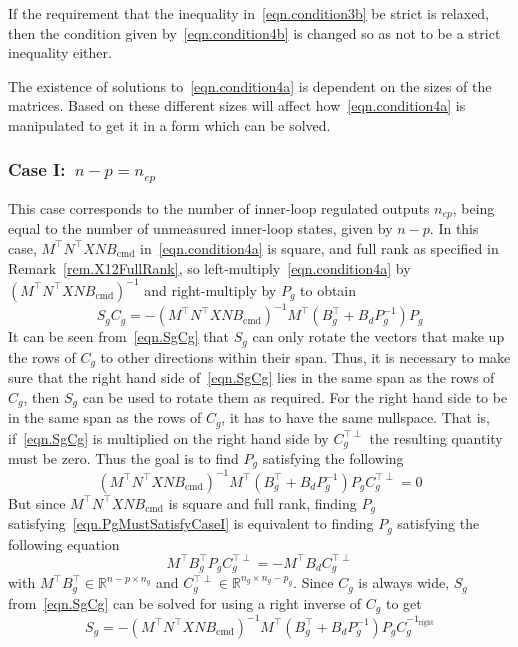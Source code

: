 \begin{rem-dan}
  If the requirement that the inequality in\ \eqref{eqn.condition3b} be strict is relaxed, then the condition given by\ \eqref{eqn.condition4b} is changed so as not to be a strict inequality either.
\end{rem-dan}

The existence of solutions to\ \eqref{eqn.condition4a} is dependent on the sizes of the matrices.
Based on these different sizes will affect how\ \eqref{eqn.condition4a} is manipulated to get it in a form which can be solved.

\subsubsection{Case I:~$n-p=n_{ep}$}

This case corresponds to the number of inner-loop regulated outputs $n_{ep}$, being equal to the number of unmeasured inner-loop states, given by $n-p$.
In this case, $M^{\top}N^{\top}XNB_{\text{cmd}}$ in\ \eqref{eqn.condition4a} is square, and full rank as specified in Remark~\ref{rem.X12FullRank}, so left-multiply\ \eqref{eqn.condition4a} by $(M^{\top}N^{\top}XNB_{\text{cmd}})^{-1}$ and right-multiply by $P_{g}$ to obtain
\begin{equation}
  \label{eqn.SgCg}
  S_{g}C_{g} = - (M^{\top}N^{\top}XNB_{\text{cmd}})^{-1}M^{\top}(B_{g}^{\top}+B_{d}P_{g}^{-1})P_{g}
\end{equation}
It can be seen from\ \eqref{eqn.SgCg} that $S_{g}$ can only rotate the vectors that make up the rows of $C_{g}$ to other directions within their span.
Thus, it is necessary to make sure that the right hand side of\ \eqref{eqn.SgCg} lies in the same span as the rows of $C_{g}$, then $S_{g}$ can be used to rotate them as required.
For the right hand side to be in the same span as the rows of $C_{g}$, it has to have the same nullspace.
That is, if\ \eqref{eqn.SgCg} is multiplied on the right hand side by $C_{g}^{\top\perp}$ the resulting quantity must be zero.
Thus the goal is to find $P_{g}$ satisfying the following
\begin{equation}
  \label{eqn.PgMustSatisfyCaseI}
  (M^{\top}N^{\top}XNB_{\text{cmd}})^{-1}M^{\top}(B_{g}^{\top}+B_{d}P_{g}^{-1})P_{g}C_{g}^{\top\perp} = 0
\end{equation}
But since $M^{\top}N^{\top}XNB_{\text{cmd}}$ is square and full rank, finding $P_{g}$ satisfying\ \eqref{eqn.PgMustSatisfyCaseI} is equivalent to finding $P_{g}$ satisfying the following equation
\begin{equation}
  \label{eqn.AXBCcase1}
  M^{\top}B_{g}^{\top}P_{g}C_{g}^{\top\perp} = -M^{\top}B_{d}C_{g}^{\top\perp}
\end{equation}
with $M^{\top}B_{g}^{\top}\in\mathbb{R}^{n-p\times n_{g}}$ and $C_{g}^{\top\perp}\in\mathbb{R}^{n_{g}\times n_{g}-p_{g}}$.
Since $C_{g}$ is always wide, $S_{g}$ from\ \eqref{eqn.SgCg} can be solved for using a right inverse of $C_{g}$ to get
\begin{equation}
  \label{eqn.SgCaseI}
  S_{g} = - (M^{\top}N^{\top}XNB_{\text{cmd}})^{-1}M^{\top}(B_{g}^{\top}+B_{d}P_{g}^{-1})P_{g}C_{g}^{-1_{\text{right}}}
\end{equation}

